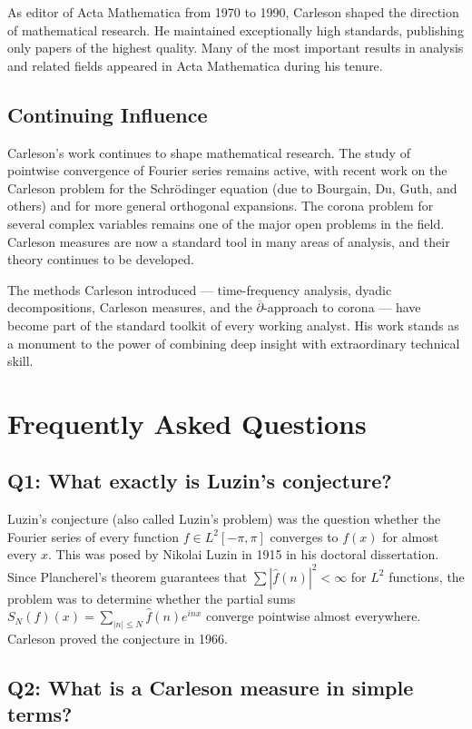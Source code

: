 As editor of Acta Mathematica from 1970 to 1990, Carleson shaped the direction of mathematical research. He maintained exceptionally high standards, publishing only papers of the highest quality. Many of the most important results in analysis and related fields appeared in Acta Mathematica during his tenure.

\subsection{Continuing Influence}

Carleson's work continues to shape mathematical research. The study of pointwise convergence of Fourier series remains active, with recent work on the Carleson problem for the Schr\"odinger equation (due to Bourgain, Du, Guth, and others) and for more general orthogonal expansions. The corona problem for several complex variables remains one of the major open problems in the field. Carleson measures are now a standard tool in many areas of analysis, and their theory continues to be developed.

The methods Carleson introduced --- time-frequency analysis, dyadic decompositions, Carleson measures, and the \(\overline{\partial}\)-approach to corona --- have become part of the standard toolkit of every working analyst. His work stands as a monument to the power of combining deep insight with extraordinary technical skill.

\section{Frequently Asked Questions}

\subsection*{Q1: What exactly is Luzin's conjecture?}

Luzin's conjecture (also called Luzin's problem) was the question whether the Fourier series of every function \(f \in L^2[-\pi,\pi]\) converges to \(f(x)\) for almost every \(x\). This was posed by Nikolai Luzin in 1915 in his doctoral dissertation. Since Plancherel's theorem guarantees that \(\sum |\widehat{f}(n)|^2 < \infty\) for \(L^2\) functions, the problem was to determine whether the partial sums \(S_N(f)(x) = \sum_{|n| \leq N} \widehat{f}(n) e^{inx}\) converge pointwise almost everywhere. Carleson proved the conjecture in 1966.

\subsection*{Q2: What is a Carleson measure in simple terms?}

